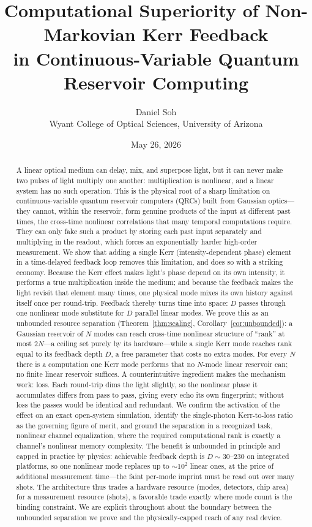\documentclass[11pt]{article}
\title{\textbf{Computational Superiority of Non-Markovian Kerr Feedback\\
in Continuous-Variable Quantum Reservoir Computing}}
\author{Daniel Soh\\
\small Wyant College of Optical Sciences, University of Arizona}
\date{May 26, 2026}
\theoremstyle{remark}
\begin{document}
\maketitle

\begin{abstract}
A linear optical medium can delay, mix, and superpose light, but it can never make
two pulses of light multiply one another: multiplication is nonlinear, and a linear
system has no such operation. This is the physical root of a sharp limitation on
continuous-variable quantum reservoir computers (QRCs) built from Gaussian
optics---they cannot, within the reservoir, form genuine products of the input at
different past times, the cross-time nonlinear correlations that many temporal
computations require. They can only fake such a product by storing each past input
separately and multiplying in the readout, which forces an exponentially harder
high-order measurement. We show that adding a single Kerr (intensity-dependent
phase) element in a time-delayed feedback loop removes this limitation, and does so
with a striking economy. Because the Kerr effect makes light's phase depend on its
own intensity, it performs a true multiplication inside the medium; and because the
feedback makes the light revisit that element many times, one physical mode mixes
its own history against itself once per round-trip. Feedback thereby turns time into
space: $D$ passes through one nonlinear mode substitute for $D$ parallel linear
modes. We prove this as an unbounded resource separation (Theorem~\ref{thm:scaling},
Corollary~\ref{cor:unbounded}): a Gaussian reservoir of $N$ modes can reach
cross-time nonlinear structure of ``rank'' at most $2N$---a ceiling set purely by
its hardware---while a single Kerr mode reaches rank equal to its feedback depth
$D$, a free parameter that costs no extra modes. For every $N$ there is a
computation one Kerr mode performs that no $N$-mode linear reservoir can; no finite
linear reservoir suffices. A counterintuitive ingredient makes the mechanism work:
loss. Each round-trip dims the light slightly, so the nonlinear phase it accumulates
differs from pass to pass, giving every echo its own fingerprint; without loss the
passes would be identical and redundant. We confirm the activation of the effect on
an exact open-system simulation, identify the single-photon Kerr-to-loss ratio as
the governing figure of merit, and ground the separation in a recognized task,
nonlinear channel equalization, where the required computational rank is exactly a
channel's nonlinear memory complexity. The benefit is unbounded in principle and
capped in practice by physics: achievable feedback depth is $D\sim30$--$230$ on
integrated platforms, so one nonlinear mode replaces up to $\sim10^2$ linear ones,
at the price of additional measurement time---the faint per-mode imprint must be
read out over many shots. The architecture thus trades a hardware resource (modes,
detectors, chip area) for a measurement resource (shots), a favorable trade exactly
where mode count is the binding constraint. We are explicit throughout about the
boundary between the unbounded separation we prove and the physically-capped reach
of any real device.
\end{abstract}
\end{document}

